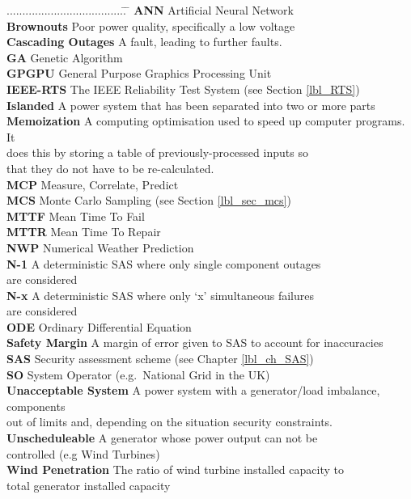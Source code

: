 \documentclass[a4paper,oneside,12pt]{report}
\begin{document}
\begin{tabbing}
.....................................\= . \=\kill
{\bfseries ANN} \> Artificial Neural Network\\
{\bfseries Brownouts} \> Poor power quality, specifically a low voltage\\
{\bfseries Cascading Outages} \> A fault, leading to further faults.\\
{\bfseries GA} \> Genetic Algorithm\\
{\bfseries GPGPU} \> General Purpose Graphics Processing Unit\\
{\bfseries IEEE-RTS} \> The IEEE Reliability Test System (see Section \ref{lbl_RTS})\\
{\bfseries Islanded} \> A power system that has been separated into two or more parts \\
{\bfseries Memoization} \> A computing optimisation used to speed up computer programs. It \\
\> \> does this by storing a table of previously-processed inputs so \\
\> \> that they do not have to be re-calculated.\\
{\bfseries MCP} \> Measure, Correlate, Predict \\
{\bfseries MCS} \> Monte Carlo Sampling  (see Section \ref{lbl_sec_mcs})\\
{\bfseries MTTF} \> Mean Time To Fail\\
{\bfseries MTTR} \> Mean Time To Repair\\
{\bfseries NWP} \> Numerical Weather Prediction\\
{\bfseries N-1} \> A deterministic SAS where only single component outages \\
\> \> are considered\\
{\bfseries N-x} \> A deterministic SAS where only `x' simultaneous failures \\
\> \> are considered\\
{\bfseries ODE} \> Ordinary Differential Equation\\
{\bfseries Safety Margin} \> A margin of error given to SAS to account for inaccuracies\\
{\bfseries SAS} \> Security assessment scheme (see Chapter \ref{lbl_ch_SAS})\\
{\bfseries SO} \> System Operator (e.g.\ National Grid in the UK)\\
{\bfseries Unacceptable System} A power system with a generator/load imbalance, components \\
\> \> out of limits and, depending on the situation security constraints.\\
{\bfseries Unscheduleable} \> A generator whose power output can not be \\
\> \>  controlled (e.g Wind Turbines)\\
{\bfseries Wind Penetration} \> The ratio of wind turbine installed capacity to \\
\> \> total generator installed capacity\\
\end{tabbing}
\end{document}
